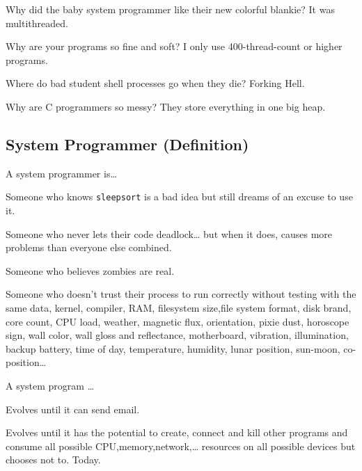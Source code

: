 Why did the baby system programmer like their new colorful blankie? It was multithreaded.

Why are your programs so fine and soft? I only use 400-thread-count or higher programs.

Where do bad student shell processes go when they die? Forking Hell.

Why are C programmers so messy? They store everything in one big heap.

\subsection{System Programmer (Definition)}

A system programmer is\ldots{}

Someone who knows \texttt{sleepsort} is a bad idea but still dreams of an excuse to use it.

Someone who never lets their code deadlock\ldots{} but when it does, causes more problems than everyone else combined.

Someone who believes zombies are real.

Someone who doesn't trust their process to run correctly without testing with the same data, kernel, compiler, RAM, filesystem size,file system format, disk brand, core count, CPU load, weather, magnetic flux, orientation, pixie dust, horoscope sign, wall color, wall gloss and reflectance, motherboard, vibration, illumination, backup battery, time of day, temperature, humidity, lunar position, sun-moon, co-position\ldots{}

A system program \ldots{}

Evolves until it can send email.

Evolves until it has the potential to create, connect and kill other programs and consume all possible CPU,memory,network,\ldots{} resources on all possible devices but chooses not to. Today.
